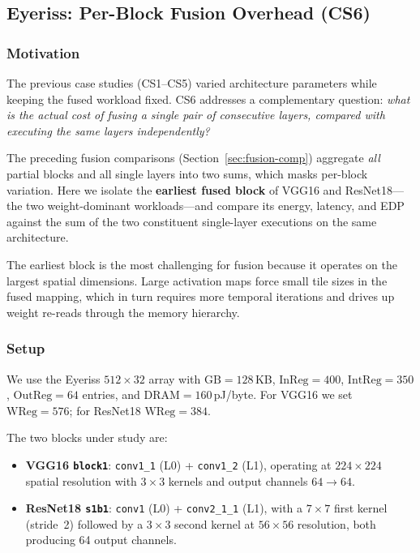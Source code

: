 \subsection{Eyeriss: Per-Block Fusion Overhead (CS6)}
\label{sec:eyeriss-cs6}

\subsubsection{Motivation}

The previous case studies (CS1--CS5) varied architecture parameters
while keeping the fused workload fixed.
CS6 addresses a complementary question:
\emph{what is the actual cost of fusing a single pair of consecutive
layers, compared with executing the same layers independently?}

The preceding fusion comparisons (Section~\ref{sec:fusion-comp})
aggregate \emph{all} partial blocks and all single layers into two
sums, which masks per-block variation.
Here we isolate the \textbf{earliest fused block} of VGG16 and
ResNet18---the two weight-dominant workloads---and compare its
energy, latency, and EDP against the sum of the two constituent
single-layer executions on the same architecture.

The earliest block is the most challenging for fusion because it
operates on the largest spatial dimensions.
Large activation maps force small tile sizes in the fused mapping,
which in turn requires more temporal iterations and drives up weight
re-reads through the memory hierarchy.

\subsubsection{Setup}

We use the Eyeriss $512 \times 32$ array with $\text{GB} = 128$\,KB,
$\text{InReg} = 400$, $\text{IntReg} = 350$, $\text{OutReg} = 64$
entries, and $\text{DRAM} = 160$\,pJ/byte.
For VGG16 we set $\text{WReg} = 576$; for ResNet18
$\text{WReg} = 384$.

The two blocks under study are:
\begin{itemize}
  \item \textbf{VGG16 \texttt{block1}}: \texttt{conv1\_1} (L0) +
    \texttt{conv1\_2} (L1), operating at $224 \times 224$ spatial
    resolution with $3 \times 3$ kernels and output channels
    $64 \to 64$.
  \item \textbf{ResNet18 \texttt{s1b1}}: \texttt{conv1} (L0) +
    \texttt{conv2\_1\_1} (L1), with a $7 \times 7$ first kernel
    (stride~2) followed by a $3 \times 3$ second kernel at
    $56 \times 56$ resolution, both producing 64 output channels.
\end{itemize}

